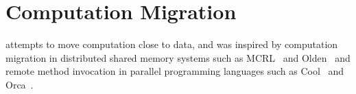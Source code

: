 \section{Computation Migration}

\cphash{} attempts to move computation close to data, and was inspired by 
computation migration in distributed shared memory systems such as MCRL~\cite{hsieh:sc} and
Olden~\cite{olden} and remote method invocation in parallel programming languages such as 
Cool~\cite{COOL} and Orca~\cite{orca:tocs}.

